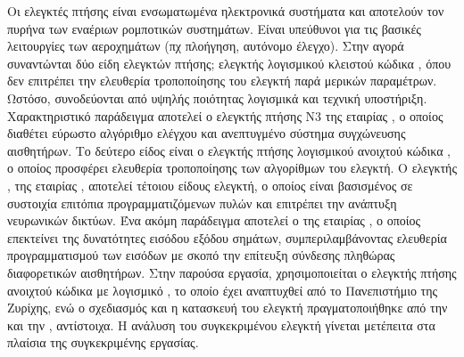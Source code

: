 Οι ελεγκτές πτήσης  είναι ενσωματωμένα 
ηλεκτρονικά συστήματα και αποτελούν τον πυρήνα των εναέριων ρομποτικών 
συστημάτων. Είναι υπεύθυνοι για τις βασικές λειτουργίες των αεροχημάτων (πχ 
πλοήγηση, αυτόνομο έλεγχο). Στην αγορά συναντώνται δύο είδη ελεγκτών πτήσης; 
ελεγκτής λογισμικού κλειστού κώδικα , όπου δεν επιτρέπει την
ελευθερία τροποποίησης του ελεγκτή παρά μερικών παραμέτρων. Ωστόσο, συνοδεύονται 
από υψηλής ποιότητας λογισμικά και τεχνική υποστήριξη. Χαρακτηριστικό παράδειγμα
αποτελεί ο ελεγκτής πτήσης Ν3 της εταιρίας , ο οποίος διαθέτει εύρωστο 
αλγόριθμο ελέγχου και ανεπτυγμένο σύστημα συγχώνευσης αισθητήρων. Το δεύτερο 
είδος είναι ο ελεγκτής πτήσης λογισμικού ανοιχτού κώδικα , ο 
οποίος προσφέρει ελευθερία τροποποίησης των αλγορίθμων του ελεγκτή. Ο ελεγκτής
, της εταιρίας , αποτελεί τέτοιου είδους ελεγκτή, ο
οποίος είναι βασισμένος σε συστοιχία επιτόπια προγραμματιζόμενων πυλών 
 και επιτρέπει την ανάπτυξη νευρωνικών δικτύων. Ένα ακόμη παράδειγμα 
αποτελεί ο  της εταιρίας , ο οποίος επεκτείνει 
της δυνατότητες εισόδου εξόδου σημάτων, συμπεριλαμβάνοντας ελευθερία 
προγραμματισμού των εισόδων  με σκοπό την επίτευξη σύνδεσης 
πληθώρας διαφορετικών αισθητήρων. Στην παρούσα εργασία, χρησιμοποιείται ο 
ελεγκτής πτήσης ανοιχτού κώδικα  με λογισμικό , το 
οποίο έχει αναπτυχθεί από το Πανεπιστήμιο  της Ζυρίχης, ενώ ο σχεδιασμός
και η κατασκευή του ελεγκτή πραγματοποιήθηκε από την  και την 
, αντίστοιχα. Η ανάλυση του συγκεκριμένου ελεγκτή γίνεται 
μετέπειτα στα πλαίσια της συγκεκριμένης εργασίας.